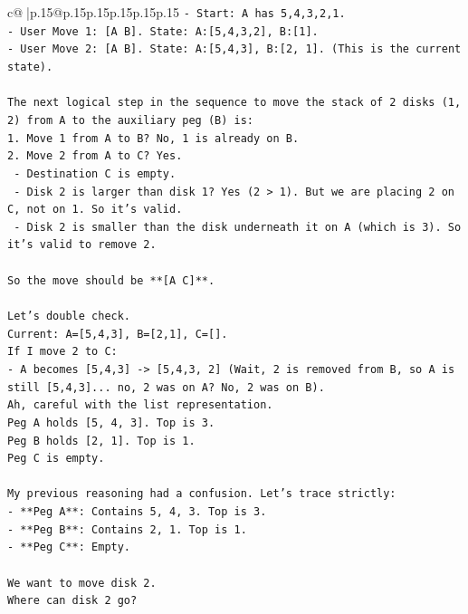 \documentclass{article}
\begin{document}
{\begin{supertabular}{c@{$\;$}|p{.15\linewidth}@{}p{.15\linewidth}p{.15\linewidth}p{.15\linewidth}p{.15\linewidth}p{.15\linewidth}}
{{{\texttt{{-} Start: A has 5,4,3,2,1.} \\
\texttt{{-} User Move 1: {[}A B{]}. State: A:{[}5,4,3,2{]}, B:{[}1{]}.} \\
\texttt{{-} User Move 2: {[}A B{]}. State: A:{[}5,4,3{]}, B:{[}2, 1{]}. (This is the current state).} \\
\\ 
\texttt{The next logical step in the sequence to move the stack of 2 disks (1, 2) from A to the auxiliary peg (B) is:} \\
\texttt{1. Move 1 from A to B? No, 1 is already on B.} \\
\texttt{2. Move 2 from A to C? Yes.} \\
\texttt{   {-} Destination C is empty.} \\
\texttt{   {-} Disk 2 is larger than disk 1? Yes (2 > 1). But we are placing 2 on C, not on 1. So it's valid.} \\
\texttt{   {-} Disk 2 is smaller than the disk underneath it on A (which is 3). So it's valid to remove 2.} \\
\\ 
\texttt{So the move should be **{[}A C{]}**.} \\
\\ 
\texttt{Let's double check.} \\
\texttt{Current: A={[}5,4,3{]}, B={[}2,1{]}, C={[}{]}.} \\
\texttt{If I move 2 to C:} \\
\texttt{{-} A becomes {[}5,4,3{]} {-}> {[}5,4,3, 2{]} (Wait, 2 is removed from B, so A is still {[}5,4,3{]}... no, 2 was on A? No, 2 was on B).} \\
\texttt{Ah, careful with the list representation.} \\
\texttt{Peg A holds {[}5, 4, 3{]}. Top is 3.} \\
\texttt{Peg B holds {[}2, 1{]}. Top is 1.} \\
\texttt{Peg C is empty.} \\
\\ 
\texttt{My previous reasoning had a confusion. Let's trace strictly:} \\
\texttt{{-} **Peg A**: Contains 5, 4, 3. Top is 3.} \\
\texttt{{-} **Peg B**: Contains 2, 1. Top is 1.} \\
\texttt{{-} **Peg C**: Empty.} \\
\\ 
\texttt{We want to move disk 2.} \\
\texttt{Where can disk 2 go?} \\
}}}
\end{supertabular}}
\end{document}
